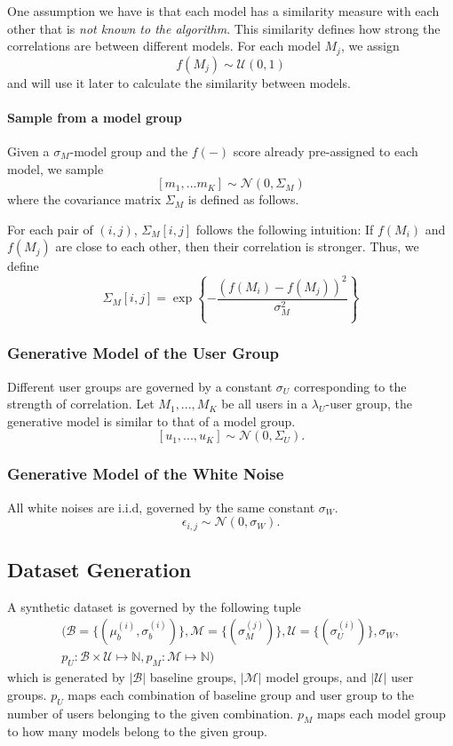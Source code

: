 \documentclass[letterpaper]{vldb}
\begin{document}
One assumption we have is that each model has a similarity measure with each
other that is {\em not known to the algorithm}. This similarity defines how strong
the correlations are between different models. For each 
model $M_j$, we assign 
\[
f(M_j) \sim \mathcal{\mathcal{U}}(0, 1)
\]
and will use it later to calculate the similarity between models.

\paragraph*{Sample from a model group}

Given a $\sigma_M$-model group and the $f(-)$ score already pre-assigned to each
model, we sample 
\[
[m_1,...m_K] \sim \mathcal{N}(0, \Sigma_M)
\]
where the covariance matrix $\Sigma_M$ is defined as follows.

For each pair of $(i,j)$, $\Sigma_M[i,j]$ follows the following intuition:
If $f(M_i)$ and $f(M_j)$ are close to each other, then their correlation
is stronger. Thus, we define
\[
\Sigma_M[i,j] = \exp \left\{-\frac{(f(M_i) - f(M_j))^2}{\sigma_M^2} \right\}
\]

\subsubsection{Generative Model of the User Group}

Different user groups are governed by a constant $\sigma_U$ corresponding to
the strength of correlation. Let ${M_1,...,M_K}$ be all users in a
$\lambda_U$-user group, the generative model is similar to that of a model group.
\[
[u_1,...,u_K] \sim \mathcal{N}(0, \Sigma_U).
\]

\subsubsection{Generative Model of the White Noise}

All white noises are i.i.d, governed by the same constant $\sigma_W$.
\[
\epsilon_{i,j} \sim \mathcal{N}(0, \sigma_W).
\]


\subsection{Dataset Generation}

A synthetic dataset is governed by the following tuple
\begin{eqnarray*}
( 
\mathcal{B} = \{(\mu_b^{(i)}, \sigma_b^{(i)})\},
\mathcal{M} = \{(\sigma_M^{(j)})\},
\mathcal{U} = \{(\sigma_U^{(i)})\},
\sigma_W,  \\
p_U: \mathcal{B} \times \mathcal{U} \mapsto \mathbb{N},
p_M: \mathcal{M} \mapsto \mathbb{N}
)
\end{eqnarray*}
which is generated by 
$|\mathcal{B}|$ baseline groups, 
$|\mathcal{M}|$ model groups, 
and $|\mathcal{U}|$ user groups. $p_U$
maps each combination of baseline group
and user group to the number of users
belonging to the given combination.
$p_M$ maps each model group to how many
models belong to the given group.
\end{document}
